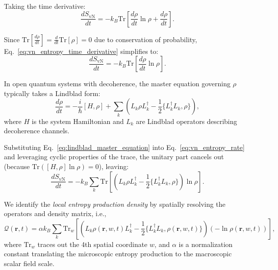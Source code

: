 \documentclass[12pt]{article}
\begin{document}
Taking the time derivative:
\begin{equation}
\frac{d S_{\mathrm{vN}}}{dt} = -k_B \mathrm{Tr}\left[\frac{d\rho}{dt} \ln \rho + \frac{d\rho}{dt} \right].
\label{eq:vn_entropy_time_derivative}
\end{equation}

Since \(\mathrm{Tr}[\frac{d\rho}{dt}] = \frac{d}{dt} \mathrm{Tr}[\rho] = 0\) due to conservation of probability, Eq.~\eqref{eq:vn_entropy_time_derivative} simplifies to:
\begin{equation}
\frac{d S_{\mathrm{vN}}}{dt} = -k_B \mathrm{Tr} \left[ \frac{d \rho}{dt} \ln \rho \right].
\label{eq:vn_entropy_rate}
\end{equation}

In open quantum systems with decoherence, the master equation governing \(\rho\) typically takes a Lindblad form:
\begin{equation}
\frac{d \rho}{dt} = -\frac{i}{\hbar} [H, \rho] + \sum_k \left( L_k \rho L_k^\dagger - \frac{1}{2} \{L_k^\dagger L_k, \rho \} \right),
\label{eq:lindblad_master_equation}
\end{equation}
where \(H\) is the system Hamiltonian and \(L_k\) are Lindblad operators describing decoherence channels.

Substituting Eq.~\eqref{eq:lindblad_master_equation} into Eq.~\eqref{eq:vn_entropy_rate} and leveraging cyclic properties of the trace, the unitary part cancels out (because \(\mathrm{Tr}([H, \rho] \ln \rho) = 0\)), leaving:
\begin{equation}
\frac{d S_{\mathrm{vN}}}{dt} = -k_B \sum_k \mathrm{Tr} \left[ \left( L_k \rho L_k^\dagger - \frac{1}{2} \{ L_k^\dagger L_k, \rho \} \right) \ln \rho \right].
\label{eq:vn_entropy_rate_lindblad}
\end{equation}

We identify the \emph{local entropy production density} by spatially resolving the operators and density matrix, i.e.,
\begin{equation}
\mathcal{Q}(\mathbf{r}, t) = \alpha k_B \sum_k \mathrm{Tr}_w \left[ \left( L_k \rho(\mathbf{r}, w, t) L_k^\dagger - \frac{1}{2} \{ L_k^\dagger L_k, \rho(\mathbf{r}, w, t) \} \right) \left( - \ln \rho(\mathbf{r}, w, t) \right) \right],
\label{eq:local_entropy_production}
\end{equation}
where \(\mathrm{Tr}_w\) traces out the 4th spatial coordinate \(w\), and \(\alpha\) is a normalization constant translating the microscopic entropy production to the macroscopic scalar field scale.
\end{document}
